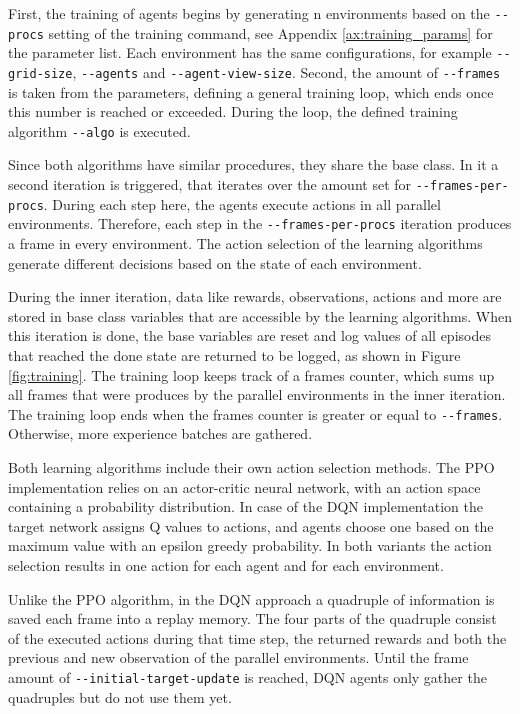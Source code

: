 First, the training of agents begins by generating n environments based on the \verb|--procs| setting of the training command, see Appendix \ref{ax:training_params} for the parameter list. Each environment has the same configurations, for example \verb|--grid-size|, \verb|--agents| and \verb|--agent-view-size|. Second, the amount of \verb|--frames| is taken from the parameters, defining a general training loop, which ends once this number is reached or exceeded. During the loop, the defined training algorithm \verb|--algo| is executed.

Since both algorithms have similar procedures, they share the base class. In it a second iteration is triggered, that iterates over the amount set for \verb|--frames-per-procs|. During each step here, the agents execute actions in all parallel environments. Therefore, each step in the \verb|--frames-per-procs| iteration produces a frame in every environment. The action selection of the learning algorithms generate different decisions based on the state of each environment.

During the inner iteration, data like rewards, observations, actions and more are stored in base class variables that are accessible by the learning algorithms. When this iteration is done, the base variables are reset and log values of all episodes that reached the done state are returned to be logged, as shown in Figure \ref{fig:training}. The training loop keeps track of a frames counter, which sums up all frames that were produces by the parallel environments in the inner iteration. The training loop ends when the frames counter is greater or equal to \verb|--frames|. Otherwise, more experience batches are gathered.

Both learning algorithms include their own action selection methods. The PPO implementation relies on an actor-critic neural network, with an action space containing a probability distribution. In case of the DQN implementation the target network assigns Q values to actions, and agents choose one based on the maximum value with an epsilon greedy probability. In both variants the action selection results in one action for each agent and for each environment.

Unlike the PPO algorithm, in the DQN approach a quadruple of information is saved each frame into a replay memory. The four parts of the quadruple consist of the executed actions during that time step, the returned rewards and both the previous and new observation of the parallel environments. Until the frame amount of \verb|--initial-target-update| is reached, DQN agents only gather the quadruples but do not use them yet.

